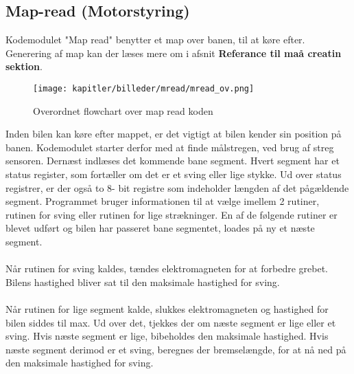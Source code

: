 \newpage

\subsection{Map-read (Motorstyring)}

Kodemodulet "Map read"  benytter et map over banen, til at køre efter. Generering af map kan der læses mere om i afsnit \textbf{Referance til maå creatin sektion}.\\

\begin{figure}[ht]
\centering
\texttt{[image: kapitler/billeder/mread/mread\_ov.png]}
\caption{Overordnet flowchart over map read koden}
\label{fig:mread}
\end{figure}

Inden bilen kan køre efter mappet, er det vigtigt at bilen kender sin position på banen. Kodemodulet starter derfor med at finde målstregen, ved brug af streg sensoren. Dernæst indlæses det kommende bane segment. Hvert segment har et status register, som fortæller om det er et sving eller lige stykke. Ud over status registrer, er der også to 8- bit registre som indeholder længden af det pågældende segment. Programmet bruger informationen til at vælge imellem 2 rutiner, rutinen for sving eller rutinen for lige strækninger. En af de følgende rutiner er blevet udført og bilen har passeret bane segmentet, loades på ny et næste segment.\\
\\
Når rutinen for sving kaldes, tændes elektromagneten for at forbedre grebet. Bilens hastighed bliver sat til den maksimale hastighed for sving.\\
\\
Når rutinen for lige segment kalde, slukkes elektromagneten og hastighed for bilen siddes til max. Ud over det, tjekkes der om næste segment er lige eller et sving. Hvis næste segment er lige, bibeholdes den maksimale hastighed. Hvis næste segment derimod er et sving, beregnes der bremselængde, for at nå ned på den maksimale hastighed for sving.\\

